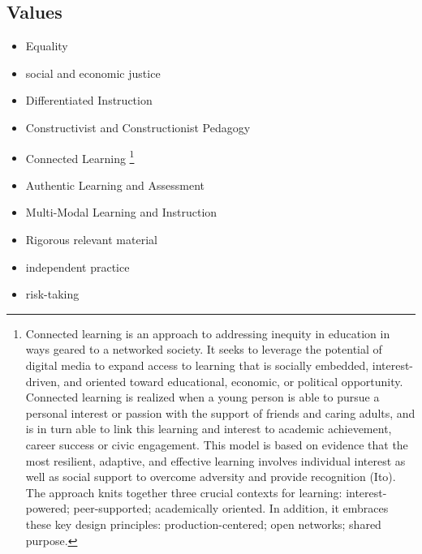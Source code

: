 \documentclass[letterpaper,10pt,english]{sphinxmanual}
\begin{document}
\subsection{Values}
\label{philosophy:values}\begin{itemize}
\item {} 
Equality

\item {} 
social and economic justice

\item {} 
Differentiated Instruction

\item {} 
Constructivist and Constructionist Pedagogy

\item {} 
Connected Learning \footnote{
Connected learning is an approach to addressing inequity in education in ways geared to a networked society. It seeks to leverage the potential of digital media to expand access to learning that is socially embedded, interest-driven, and oriented toward educational, economic, or political opportunity. Connected learning is realized when a young person is able to pursue a personal interest or passion with the support of friends and caring adults, and is in turn able to link this learning and interest to academic achievement, career success or civic engagement. This model is based on evidence that the most resilient, adaptive, and effective learning involves individual interest as well as social support to overcome adversity and provide recognition (Ito). The approach knits together three crucial contexts for learning: interest-powered; peer-supported; academically oriented. In addition, it embraces these key design principles: production-centered; open networks; shared purpose.
}

\item {} 
Authentic Learning and Assessment

\item {} 
Multi-Modal Learning and Instruction

\item {} 
Rigorous relevant material

\item {} 
independent practice

\item {} 
risk-taking

\end{itemize}
\end{document}
